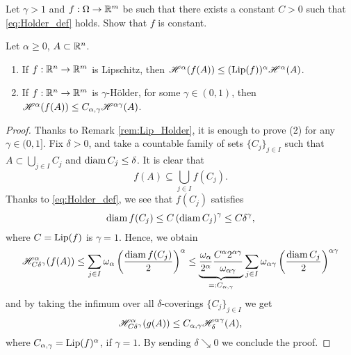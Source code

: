 \begin{exercise}
Let $\gamma > 1$ and $f: \Omega \to \mathbb{R}^{m}$ be such that there exists a constant $C > 0$ such that \eqref{eq:Holder_def} holds. Show that $f$ is constant.
\end{exercise}

\begin{proposition}
Let $\alpha \geq 0$, $A \subset \mathbb{R}^n$.
\begin{enumerate}[(1)]
\item If $f : \mathbb{R}^n \to \mathbb{R}^m$ is Lipschitz, then $\mathscr{H}^{\alpha}(f(A)) \leq
(\operatorname{Lip}(f))^\alpha \mathscr{H}^{\alpha}(A)$.
\item If $f : \mathbb{R}^n \to \mathbb{R}^m$ is $\gamma$-H\"older, for some $\gamma \in (0, 1)$, then $\mathscr{H}^{\alpha}(f(A)) \leq
C_{\alpha,\gamma} \mathscr{H}^{\alpha \gamma}(A)$.
\end{enumerate}
\end{proposition}

\begin{proof}
Thanks to Remark \ref{rem:Lip_Holder}, it is enough to prove (2) for any $\gamma \in (0, 1]$. Fix $\delta > 0$, and take a countable family of sets $\{C_j\}_{j\in I}$
such that $A \subset \bigcup_{j\in I} C_j$ and $\operatorname{diam} C_j \leq \delta$. It is clear that
$$f(A) \subseteq \bigcup_{j\in I} f(C_j).$$
Thanks to \eqref{eq:Holder_def}, we see that $f(C_j)$ satisfies
\begin{equation*}
\operatorname{diam} f(C_j)\leq C \left(\operatorname{diam} C_j\right)^\gamma \leq C \delta^\gamma,
\end{equation*}
where $C = \operatorname{Lip}(f)$ is $\gamma = 1$.
Hence, we obtain
\[
\begin{aligned}
\mathscr{H}^{\alpha}_{C \delta^\gamma}(f(A)) \leq \sum_{j\in I} \omega_\alpha
\left(\frac{\operatorname{diam} f(C_j)}{2}\right)^\alpha
\leq 
\underbrace{\frac{\omega_\alpha}{2^\alpha} \frac{C^\alpha
2^{\alpha\gamma}}{\omega_{\alpha\gamma}}}_{=: C_{\alpha,\gamma}} \sum_{j\in I} \omega_{\alpha \gamma} 
\left(\frac{\operatorname{diam} C_j}{2}\right)^{\alpha\gamma}
\end{aligned}
\]
and by taking the infimum over all $\delta$-coverings $\{C_j\}_{j\in I}$ we get
\[
\mathscr{H}^{\alpha}_{C\delta^\gamma} (g(A)) \leq C_{\alpha,\gamma}
\mathscr{H}^{\alpha\gamma}_\delta (A),
\]
where $C_{\alpha, \gamma} = \operatorname{Lip}(f)^{\alpha}$, if $\gamma = 1$.
By sending $\delta \searrow 0$ we conclude the proof.
\end{proof}
